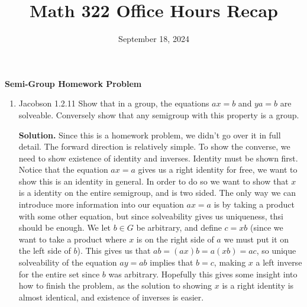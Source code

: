 \documentclass[10.5pt]{article}
\title{\vspace{-2cm} Math 322 Office Hours Recap}
\date{September 18, 2024}
\theoremstyle{definition}
\begin{document}
    \maketitle

    \textbf{Semi-Group Homework Problem}

    \begin{enumerate}
        \item Jacobson 1.2.11 Show that in a group, the equations \(ax = b\) and \(ya = b\) are solveable. Conversely show that any semigroup with this property is a group.

        \textbf{Solution.} Since this is a homework problem, we didn't go over it in full detail. The forward direction is relatively simple. To show the converse,
        we need to show existence of identity and inverses. Identity must be shown first. Notice that the equation \(ax = a\) gives us a right identity for free,
        we want to show this is an identity in general. In order to do so we want to show that \(x\) is a identity on the entire semigroup, and is two sided. The only way
        we can introduce more information into our equation \(ax = a\) is by taking a product with some other equation, but since solveability gives us uniqueness, thsi should be enough.
        We let \(b \in G\) be arbitrary, and define \(c = xb\) (since we want to take a product where \(x\) is on the right side of \(a\) we must put it on the left side of \(b\)).
        This gives us that \(ab = (ax)b = a(xb) = ac\), so unique solveability of the equation \(ay = ab\) implies that \(b = c\), making \(x\) a left inverse for the entire
        set since \(b\) was arbitrary. Hopefully this gives some insight into how to finish the problem, as the solution to showing \(x\) is a right identity is almost identical,
        and existence of inverses is easier.
    \end{enumerate}
\end{document}

